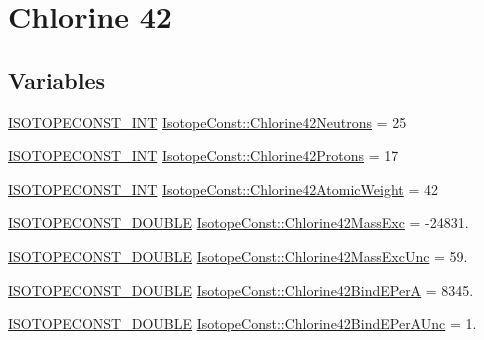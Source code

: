\hypertarget{group___isotope_const-_chlorine-_cl42}{}\section{Chlorine 42}
\label{group___isotope_const-_chlorine-_cl42}
\subsection*{Variables}
\begin{DoxyCompactItemize}
\item 
\mbox{\hyperlink{group___isotope_const-_macros_ga5f18360b3e99483a35c32d789e62621c}{I\+S\+O\+T\+O\+P\+E\+C\+O\+N\+S\+T\+\_\+\+I\+NT}} \mbox{\hyperlink{group___isotope_const-_chlorine-_cl42_gaf064567a239ce0813ed452f08431175b}{Isotope\+Const\+::\+Chlorine42\+Neutrons}} = 25
\item 
\mbox{\hyperlink{group___isotope_const-_macros_ga5f18360b3e99483a35c32d789e62621c}{I\+S\+O\+T\+O\+P\+E\+C\+O\+N\+S\+T\+\_\+\+I\+NT}} \mbox{\hyperlink{group___isotope_const-_chlorine-_cl42_ga6aad36ab41d78d52134095dbb4ae5557}{Isotope\+Const\+::\+Chlorine42\+Protons}} = 17
\item 
\mbox{\hyperlink{group___isotope_const-_macros_ga5f18360b3e99483a35c32d789e62621c}{I\+S\+O\+T\+O\+P\+E\+C\+O\+N\+S\+T\+\_\+\+I\+NT}} \mbox{\hyperlink{group___isotope_const-_chlorine-_cl42_ga63daa3cde77d41c08302ea88f2f0609b}{Isotope\+Const\+::\+Chlorine42\+Atomic\+Weight}} = 42
\item 
\mbox{\hyperlink{group___isotope_const-_macros_ga8f45a7272ce02c0b4c65c44636ed719a}{I\+S\+O\+T\+O\+P\+E\+C\+O\+N\+S\+T\+\_\+\+D\+O\+U\+B\+LE}} \mbox{\hyperlink{group___isotope_const-_chlorine-_cl42_gafc6d9350f8bde3455ecba6be2320d0e1}{Isotope\+Const\+::\+Chlorine42\+Mass\+Exc}} = -\/24831.
\item 
\mbox{\hyperlink{group___isotope_const-_macros_ga8f45a7272ce02c0b4c65c44636ed719a}{I\+S\+O\+T\+O\+P\+E\+C\+O\+N\+S\+T\+\_\+\+D\+O\+U\+B\+LE}} \mbox{\hyperlink{group___isotope_const-_chlorine-_cl42_gaa442c0fe7d51e18fcbe96dbe861ae334}{Isotope\+Const\+::\+Chlorine42\+Mass\+Exc\+Unc}} = 59.
\item 
\mbox{\hyperlink{group___isotope_const-_macros_ga8f45a7272ce02c0b4c65c44636ed719a}{I\+S\+O\+T\+O\+P\+E\+C\+O\+N\+S\+T\+\_\+\+D\+O\+U\+B\+LE}} \mbox{\hyperlink{group___isotope_const-_chlorine-_cl42_ga40cad8a4a2389eace5ef7a4967a3f69f}{Isotope\+Const\+::\+Chlorine42\+Bind\+E\+PerA}} = 8345.
\item 
\mbox{\hyperlink{group___isotope_const-_macros_ga8f45a7272ce02c0b4c65c44636ed719a}{I\+S\+O\+T\+O\+P\+E\+C\+O\+N\+S\+T\+\_\+\+D\+O\+U\+B\+LE}} \mbox{\hyperlink{group___isotope_const-_chlorine-_cl42_gade9ee242429cfe07732af374cc37670d}{Isotope\+Const\+::\+Chlorine42\+Bind\+E\+Per\+A\+Unc}} = 1.

\end{DoxyCompactItemize}
